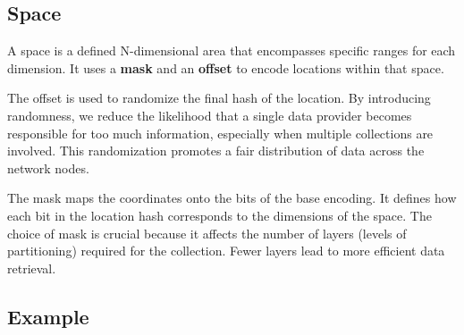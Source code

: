 \documentclass[11pt]{article}
\begin{document}
\subsection*{Space}
A space is a defined N-dimensional area that encompasses specific ranges for each dimension. It uses a \textbf{mask} and an \textbf{offset} to encode locations within that space.

\vspace{1em}

\noindent The offset is used to randomize the final hash of the location. By introducing randomness, we reduce the likelihood that a single data provider becomes responsible for too much information, especially when multiple collections are involved. This randomization promotes a fair distribution of data across the network nodes.

\vspace{1em}

\noindent The mask maps the coordinates onto the bits of the base encoding. It defines how each bit in the location hash corresponds to the dimensions of the space. The choice of mask is crucial because it affects the number of layers (levels of partitioning) required for the collection. Fewer layers lead to more efficient data retrieval.

\vspace{1em}

\subsection*{Example}
\end{document}
